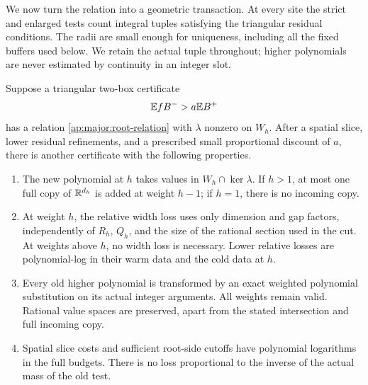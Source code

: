 We now turn the relation into a geometric transaction.  At every
site the strict and enlarged tests count integral tuples satisfying
the triangular residual conditions.  The radii are small enough for
uniqueness, including all the fixed buffers used below.  We retain
the actual tuple throughout; higher polynomials are never estimated
by continuity in an integer slot.

\begin{lemma}
\label{ap:major:transaction}
Suppose a triangular two-box certificate
\[
                         \mathbb E f B^- > a\mathbb E B^+
\]
has a relation \eqref{ap:major:root-relation} with $\lambda$ nonzero
on $W_h$.  After a spatial slice, lower residual refinements, and
a prescribed small proportional discount of $a$, there is another
certificate with the following properties.
\begin{enumerate}
\item The new polynomial at $h$ takes values in
$W_h\cap\ker\lambda$.  If $h>1$, at most one full copy of $\mathbb R^{d_h}$
is added at weight $h-1$; if $h=1$, there is no incoming copy.
\item At weight $h$, the relative width loss uses only dimension
and gap factors, independently of $R_h$, $Q_h$, and the size of
the rational section used in the cut.  At weights above $h$, no
width loss is necessary.  Lower relative losses are polynomial-log
in their warm data and the cold data at $h$.
\item Every old higher polynomial is transformed by an exact
weighted polynomial substitution on its actual integer arguments.
All weights remain valid.  Rational value spaces are preserved,
apart from the stated intersection and full incoming copy.
\item Spatial slice costs and sufficient root-side cutoffs have
polynomial logarithms in the full budgets.  There is no loss
proportional to the inverse of the actual mass of the old test.
\end{enumerate}
\end{lemma}

